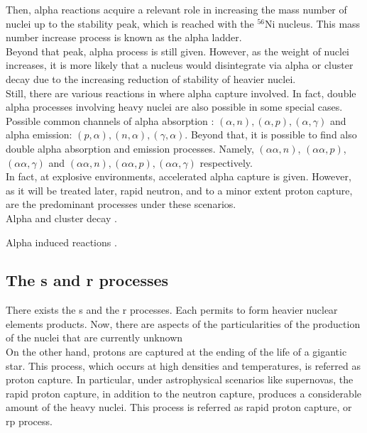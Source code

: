\documentclass[openany]{book}
\begin{document}
Then, alpha reactions acquire a relevant role in increasing the mass number of nuclei up to the stability peak, which is reached with the $\mathrm{{}^{56}Ni}$ nucleus. This mass number increase process is known as the alpha ladder.  \\

Beyond that peak, alpha process is still given. However, as the weight of nuclei increases, it is more likely that a nucleus would disintegrate via alpha or cluster decay  due to the increasing reduction of stability of heavier nuclei.  \\

Still, there are various reactions in where alpha capture involved. In fact, double alpha processes involving heavy nuclei are also possible in some special cases. \\

Possible common channels of alpha absorption :
$(\alpha, n), (\alpha, p), (\alpha, \gamma)$ and alpha emission: $(p, \alpha), (n, \alpha),  (\gamma, \alpha)$. Beyond that, it is possible to find also double alpha absorption and emission processes. Namely, $(\alpha \alpha, n)$, $(\alpha \alpha, p)$, $(\alpha \alpha, \gamma)$ and $(\alpha \alpha, n), (\alpha \alpha, p), (\alpha \alpha, \gamma)$ respectively. \\

In fact, at explosive environments, accelerated alpha capture is given. However, as it will be treated later, rapid neutron, and to a minor extent proton capture, are the predominant processes under these scenarios. \\  



Alpha and cluster decay \cite{maroufi_dehghani_alavi_2019}.

Alpha induced reactions \cite{le_duy_hung_2021}.


\subsection{The s and r processes} \label{sub:srProcesses}

There exists the s and  the r processes. Each permits to form heavier nuclear elements products. Now, there are aspects of the particularities of the production of the nuclei that  are currently  unknown \\

On the other hand, protons are captured at the ending of the life of a gigantic star. This process, which occurs at high densities and temperatures, is referred as proton capture. In particular, under astrophysical scenarios like supernovas, the rapid proton capture, in addition to the neutron capture,  produces a considerable amount of the heavy nuclei. This process is referred as rapid proton capture, or rp process. \\ 
\end{document}
